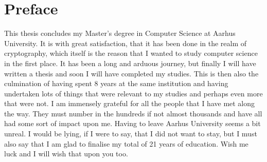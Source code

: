 
\chapter{Preface}
\label{chap:preface}
This thesis concludes my Master's degree in Computer Science at Aarhus University. It is with great satisfaction, that it has been done in the realm of cryptography, which itself is the reason that I wanted to study computer science in the first place. It has been a long and arduous journey, but finally I will have written a thesis and soon I will have completed my studies. This is then also the culmination of having spent 8 years at the same institution and having undertaken lots of things that were relevant to my studies and perhaps even more that were not. I am immensely grateful for all the people that I have met along the way. They must number in the hundreds if not almost thousands and have all had some sort of impact upon me. Having to leave Aarhus University seems a bit unreal. I would be lying, if I were to say, that I did not want to stay, but I must also say that I am glad to finalise my total of 21 years of education. Wish me luck and I will wish that upon you too.